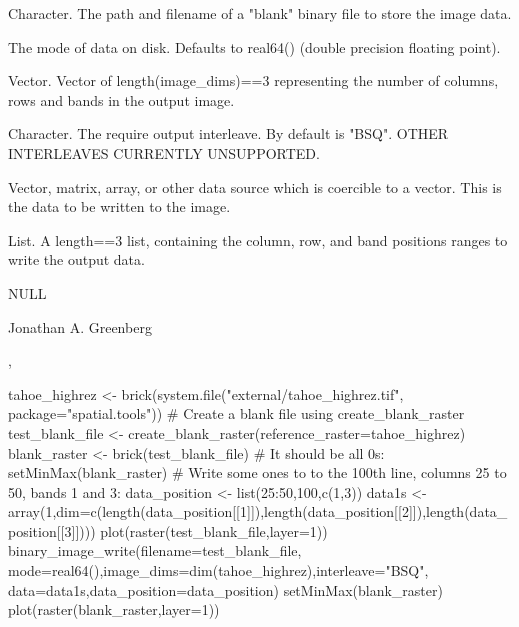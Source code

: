 \documentclass[a4paper]{book}
\begin{document}
\begin{Arguments}
\begin{ldescription}
\item[\code{filename}] Character.  The path and filename of a
"blank" binary file to store the image data.

\item[\code{mode}] The mode of data on disk.  Defaults to
real64() (double precision floating point).

\item[\code{image\_dims}] Vector. Vector of length(image\_dims)==3
representing the number of columns, rows and bands in the
output image.

\item[\code{interleave}] Character. The require output
interleave.  By default is "BSQ". OTHER INTERLEAVES
CURRENTLY UNSUPPORTED.

\item[\code{data}] Vector, matrix, array, or other data source
which is coercible to a vector. This is the data to be
written to the image.

\item[\code{data\_position}] List. A length==3 list, containing
the column, row, and band positions ranges to write the
output data.
\end{ldescription}
\end{Arguments}
%
\begin{Value}
NULL
\end{Value}
%
\begin{Author}\relax
Jonathan A. Greenberg
\end{Author}
%
\begin{SeeAlso}\relax
{},
\end{SeeAlso}
%
\begin{Examples}
\begin{ExampleCode}
tahoe_highrez <- brick(system.file("external/tahoe_highrez.tif", package="spatial.tools"))
# Create a blank file using create_blank_raster
test_blank_file <- create_blank_raster(reference_raster=tahoe_highrez)
blank_raster <- brick(test_blank_file)
# It should be all 0s:
setMinMax(blank_raster)
# Write some ones to to the 100th line, columns 25 to 50, bands 1 and 3:
data_position <- list(25:50,100,c(1,3))
data1s <- array(1,dim=c(length(data_position[[1]]),length(data_position[[2]]),length(data_position[[3]])))
plot(raster(test_blank_file,layer=1))
binary_image_write(filename=test_blank_file,
	mode=real64(),image_dims=dim(tahoe_highrez),interleave="BSQ",
	data=data1s,data_position=data_position)
setMinMax(blank_raster)
plot(raster(blank_raster,layer=1))
\end{ExampleCode}
\end{Examples}
\end{document}
